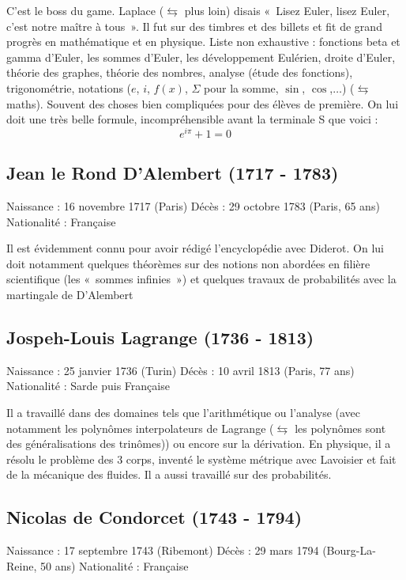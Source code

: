 C'est le boss du game. Laplace ($\leftrightarrows$ plus loin) disais « Lisez Euler, lisez Euler, c'est notre maître à tous ». Il fut sur des timbres et des billets et fit de grand progrès en mathématique et en physique. Liste non exhaustive : fonctions beta et gamma d'Euler, les sommes d'Euler, les développement Eulérien, droite d'Euler, théorie des graphes, théorie des nombres, analyse (étude des fonctions), trigonométrie, notations ($e$, $i$, $f(x)$, $\Sigma$ pour la somme, $\sin$, $\cos$,$\ldots$) ($\leftrightarrows$ maths). Souvent des choses bien compliquées pour des élèves de première. On lui doit une très belle formule, incompréhensible avant la terminale S que voici : 
$$e^{i\pi} + 1 = 0$$

\subsection*{Jean le Rond D'Alembert (1717 - 1783)}
Naissance : 16 novembre 1717 (Paris)\newline
Décès : 29 octobre 1783 (Paris, 65 ans)\newline
Nationalité : Française\newline


Il est évidemment connu pour avoir rédigé l'encyclopédie avec Diderot. On lui doit notamment quelques théorèmes sur des notions non abordées en filière scientifique (les « sommes infinies ») et quelques travaux de probabilités avec la martingale de D'Alembert


\subsection*{Jospeh-Louis Lagrange (1736 - 1813)}
Naissance : 25 janvier 1736 (Turin)\newline
Décès : 10 avril 1813 (Paris, 77 ans)\newline
Nationalité : Sarde puis Française\newline


Il a travaillé dans des domaines tels que l'arithmétique ou l'analyse (avec notamment les polynômes interpolateurs de Lagrange ($\leftrightarrows$ les polynômes sont des généralisations des trinômes)) ou encore sur la dérivation. En physique, il a résolu le problème des 3 corps, inventé le système métrique avec Lavoisier et fait de la mécanique des fluides. Il a aussi travaillé sur des probabilités.

\subsection*{Nicolas de Condorcet (1743 - 1794)}
Naissance : 17 septembre 1743 (Ribemont)\newline
Décès : 29 mars 1794 (Bourg-La-Reine, 50 ans)\newline
Nationalité : Française\newline


